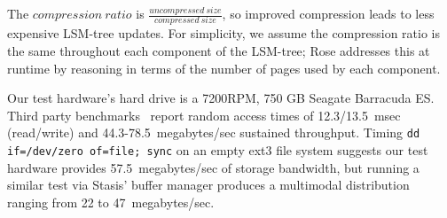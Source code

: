 \documentclass{vldb}
\newcommand{\rows}{Rose\xspace}
\begin{document}
%
%
%

The $compression~ratio$ is
$\frac{uncompressed~size}{compressed~size}$, so improved compression
leads to less expensive LSM-tree updates.  For simplicity, we assume
the compression ratio is the same throughout each component of
the LSM-tree; \rows addresses this at runtime by reasoning in terms
of the number of pages used by each component.

Our test hardware's hard drive is a 7200RPM, 750 GB Seagate Barracuda
ES.  
Third party
benchmarks~\cite{hdBench} %
report random access times of 12.3/13.5~msec (read/write) and 44.3-78.5~megabytes/sec
sustained throughput.  Timing {\tt dd if=/dev/zero of=file; sync} on an
empty ext3 file system suggests our test hardware provides 57.5~megabytes/sec of
storage bandwidth, but running a similar test via Stasis' buffer manager produces
a multimodal distribution ranging from 22 to 47~megabytes/sec.

\end{document}
